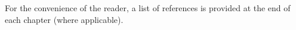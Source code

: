 

%
\ifperchapterbib%
For the convenience of the reader, a list of references is provided at the end of each chapter (where applicable).
\ifendbib%
\else\fi%
\else\fi%
